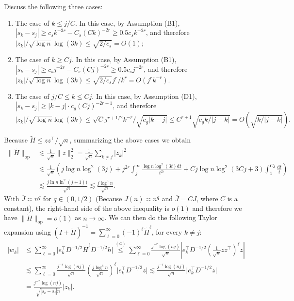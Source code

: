 \documentclass[11pt,a4paper]{article}
\renewcommand{\tilde}{\widetilde}
\renewcommand{\bar}{\overline}
\theoremstyle{definition}
\theoremstyle{plain}
\theoremstyle{remark}
\newcommand{\op}{\mathrm{op}}
\newcommand{\ud}{\mathrm d}
\begin{document}
Discuss the following three cases:
\begin{enumerate}
\item The case of $k\leq j/C$. In this case, by Assumption (B1), $|s_k-s_j|\geq c_s k^{-2r} - C_s(Ck)^{-2r}\geq 0.5c_sk^{-2r}$, and therefore $|z_k|/\sqrt{\log n}\log(3k)\leq \sqrt{2/c_s}=O(1)$;
\item The case of $k\geq Cj$. In this case, by Assumption (B1), $|s_k-s_j| \geq c_s j^{-2r} - C_s (Cj)^{-2r}\geq 0.5c_s j^{-2r}$, and therefore $|z_k|/\sqrt{\log n}\log(3k)\leq \sqrt{2/c_s}j^r/k^r= O(j^rk^{-r})$.
\item The case of $j/C\leq k\leq Cj$. In this case, by Assumption (D1), $|s_k-s_j| \geq |k-j| \cdot c_g(Cj)^{-2r-1}$, and therefore 
$$
|z_k|/\sqrt{\log n}\log(3k)\leq \sqrt{C}j^{r+1/2}k^{-r}/\sqrt{c_g|k-j|}\leq C^{r+1}\sqrt{c_gk/|j-k|}= O(\sqrt{k/|j-k|}).
$$
\end{enumerate}
Because $\tilde H \leq zz^\top/\sqrt{n}$, summarizing the above cases we obtain 
\begin{align}
\|\tilde H\|_\op&\lesssim \frac{1}{\sqrt{n}}\|z\|_2^2 =\frac{1}{\sqrt{n}}\sum_{k\neq j}|z_k|^2 \nonumber\\
& \lesssim \frac{1}{\sqrt{n}}\left(j\log n\log^2(3j) + j^{2r}\int_j^{\infty}\frac{\log n\log^2 (3t)\ud t}{t^{2r}} + Cj\log n\log^2 (3Cj+3)\int_1^{Cj} \frac{\ud t}{t}\right)\nonumber\\
& \lesssim \frac{j\ln n\ln^2 (j+1))}{\sqrt{n}}\lesssim \frac{j\log^3 n}{\sqrt{n}}.
\end{align}
With $\bar J\asymp n^q$ for $q\in(0,1/2)$ (Because $J(n)\asymp n^q$ and $\bar J=CJ$, where $C$ is a constant), the right-hand side of the above inequality is $o(1)$ and therefore we have $\|\tilde H\|_\op=o(1)$ as $n\to\infty$.
We can then do the following Taylor expansion using $(I+\tilde H)^{-1} = \sum_{\ell=0}^{\infty} (-1)^\ell \tilde H^\ell$, for every $k\neq j$:
\begin{align}
|w_k| &\leq \sum_{\ell=0}^{\infty} \big|e_k^\top D^{-1/2}\tilde H^\ell D^{-1/2}h\big| \overset{(a)}{\leq }\sum_{\ell=0}^{\infty} \frac{j^{-r}\log(nj)}{\sqrt{n}}\left|e_k^\top D^{-1/2}\left(\frac{1}{\sqrt{n}}zz^\top\right)^\ell z\right|\nonumber\\
&\lesssim \sum_{\ell=0}^{\infty}\frac{j^{-r}\log(nj)}{\sqrt{n}}\left(\frac{j\log^3 n}{\sqrt{n}}\right)^\ell \big|e_k^\top D^{-1/2}z\big| \lesssim\frac{j^{-r}\log(nj)}{\sqrt{n}}\big|e_k^\top D^{-1/2}z\big|\nonumber\\
& = \frac{j^{-r}\log (nj)}{\sqrt{|s_k-s_j| n}}\big|z_k\big|.\label{eq:proof-stability-4} 
\end{align}
\end{document}
